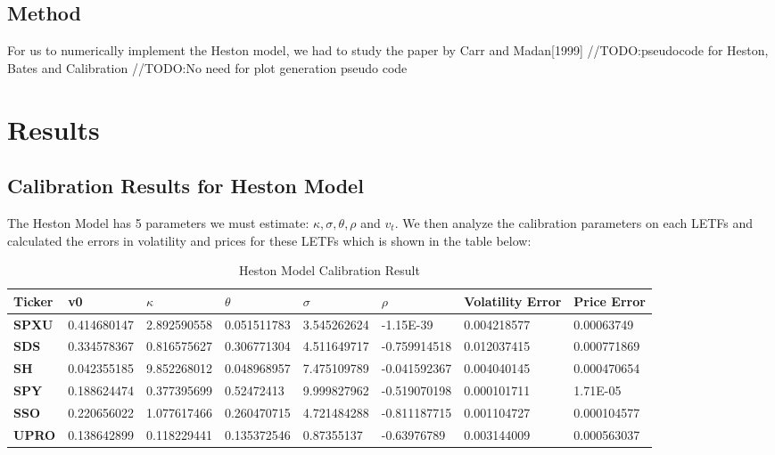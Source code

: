 \documentclass{article}
\begin{document}
\subsection{Method}

For us to numerically implement the Heston model, we had to study the paper by Carr and Madan[1999]
//TODO:pseudocode for Heston, Bates and Calibration
//TODO:No need for plot generation pseudo code

\section{Results}
\subsection{Calibration Results for Heston Model}
The Heston Model has 5 parameters we must estimate: $\kappa, \sigma, \theta, \rho$ and $v_t$. We then analyze the calibration parameters on each LETFs and calculated the errors in volatility and prices for these LETFs which is shown in the table below:

\begin{table}[h!]
\centering
\caption{Heston Model Calibration Result}
\label{my-label}
\begin{tabular}{|l|l|l|l|l|l|l|l|}
\hline
{Ticker} & {v0} & {$\kappa$}  & {$\theta$}  & {$\sigma$}  & {$\rho$}   & {Volatility Error} & {Price Error} \\ \hline
\textbf{SPXU}   & 0.414680147 & 2.892590558 & 0.051511783 & 3.545262624 & -1.15E-39    & 0.004218577               & 0.00063749           \\ \hline
\textbf{SDS}    & 0.334578367 & 0.816575627 & 0.306771304 & 4.511649717 & -0.759914518 & 0.012037415               & 0.000771869          \\ \hline
\textbf{SH}     & 0.042355185 & 9.852268012 & 0.048968957 & 7.475109789 & -0.041592367 & 0.004040145               & 0.000470654          \\ \hline
\textbf{SPY}    & 0.188624474 & 0.377395699 & 0.52472413  & 9.999827962 & -0.519070198 & 0.000101711               & 1.71E-05             \\ \hline
\textbf{SSO}    & 0.220656022 & 1.077617466 & 0.260470715 & 4.721484288 & -0.811187715 & 0.001104727               & 0.000104577          \\ \hline
\textbf{UPRO}   & 0.138642899 & 0.118229441 & 0.135372546 & 0.87355137  & -0.63976789  & 0.003144009               & 0.000563037          \\ \hline
\end{tabular}
\end{table}
\end{document}
